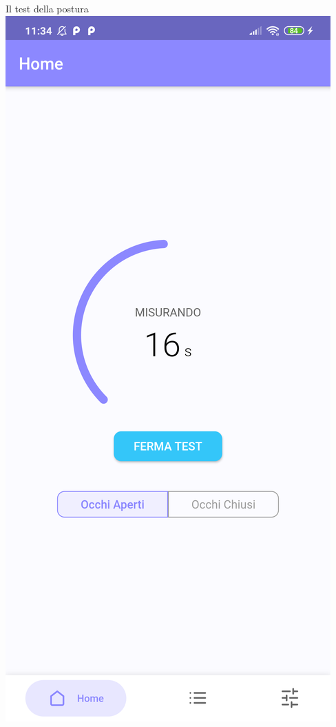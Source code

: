 \documentclass{beamer}
\begin{document}
    \begin{frame}{Il test della postura}
        \centering
        \includegraphics[scale=0.09]{../figures/screenshot/redmi_note_8t/home_measuring.png}
    \end{frame}
\end{document}
